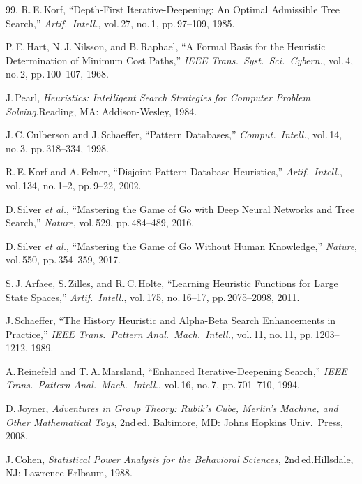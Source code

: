 \documentclass[graybox]{svmult}
\begin{document}
\begin{thebibliography}{99.}
R.\,E.\,Korf, ``Depth-First Iterative-Deepening: An Optimal
Admissible Tree Search,'' \textit{Artif.\ Intell.}, vol.\,27,
no.\,1, pp.\,97--109, 1985.

P.\,E.\,Hart, N.\,J.\,Nilsson, and B.\,Raphael, ``A Formal Basis
for the Heuristic Determination of Minimum Cost Paths,''
\textit{IEEE Trans.\ Syst.\ Sci.\ Cybern.}, vol.\,4, no.\,2,
pp.\,100--107, 1968.

J.\,Pearl, \textit{Heuristics: Intelligent Search Strategies for
Computer Problem Solving}.\quad Reading, MA: Addison-Wesley, 1984.

J.\,C.\,Culberson and J.\,Schaeffer, ``Pattern Databases,''
\textit{Comput.\ Intell.}, vol.\,14, no.\,3, pp.\,318--334, 1998.

R.\,E.\,Korf and A.\,Felner, ``Disjoint Pattern Database
Heuristics,'' \textit{Artif.\ Intell.}, vol.\,134, no.\,1--2,
pp.\,9--22, 2002.

D.\,Silver \textit{et al.}, ``Mastering the Game of {G}o with Deep
Neural Networks and Tree Search,'' \textit{Nature}, vol.\,529,
pp.\,484--489, 2016.

D.\,Silver \textit{et al.}, ``Mastering the Game of {G}o Without
Human Knowledge,'' \textit{Nature}, vol.\,550, pp.\,354--359, 2017.

S.\,J.\,Arfaee, S.\,Zilles, and R.\,C.\,Holte, ``Learning
Heuristic Functions for Large State Spaces,'' \textit{Artif.\
Intell.}, vol.\,175, no.\,16--17, pp.\,2075--2098, 2011.

J.\,Schaeffer, ``The History Heuristic and Alpha-Beta Search
Enhancements in Practice,'' \textit{IEEE Trans.\ Pattern Anal.\
Mach.\ Intell.}, vol.\,11, no.\,11, pp.\,1203--1212, 1989.

A.\,Reinefeld and T.\,A.\,Marsland, ``Enhanced Iterative-Deepening
Search,'' \textit{IEEE Trans.\ Pattern Anal.\ Mach.\ Intell.},
vol.\,16, no.\,7, pp.\,701--710, 1994.

D.\,Joyner, \textit{Adventures in Group Theory: {R}ubik's {C}ube,
{M}erlin's Machine, and Other Mathematical Toys}, 2nd\,ed.\quad
Baltimore, MD: Johns Hopkins Univ.\ Press, 2008.

J.\,Cohen, \textit{Statistical Power Analysis for the Behavioral
Sciences}, 2nd\,ed.\quad Hillsdale, NJ: Lawrence Erlbaum, 1988.


\end{thebibliography}
\end{document}
